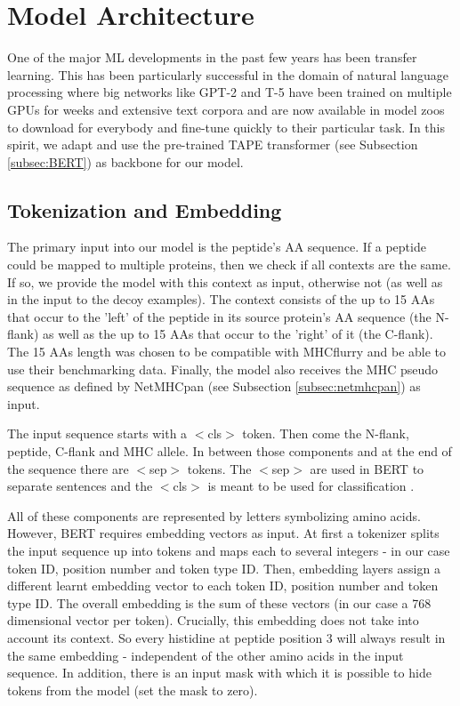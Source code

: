 \documentclass[msc,deptreport,ai]{infthesis} %
\begin{document}
	\section{Model Architecture} 
		One of the major \gls{ML} developments in the past few years has been transfer learning. This has been particularly successful in the domain of natural language processing where big networks like GPT-2 and T-5 have been trained on multiple GPUs for weeks and extensive text corpora and are now available in model zoos to download for everybody and fine-tune quickly to  their particular task. In this spirit, we adapt and use the pre-trained \gls{TAPE} transformer (see Subsection \ref{subsec:BERT}) as backbone for our model.
	
		\subsection{Tokenization and Embedding}
			The primary input into our model is the peptide's \gls{AA} sequence. If a peptide could be mapped to multiple proteins, then we check if all contexts are the same. If so, we provide the model with this context as input, otherwise not (as well as in the input to the decoy examples). The context consists of the up to 15 \glspl{AA} that occur to the 'left' of the peptide in its source protein's \gls{AA} sequence (the N-flank) as well as the up to 15 \glspl{AA} that occur to the 'right' of it (the C-flank). The 15 \glspl{AA} length was chosen to be compatible with MHCflurry and be able to use their benchmarking data. Finally, the model also receives the \gls{MHC} pseudo sequence as defined by NetMHCpan (see Subsection \ref{subsec:netmhcpan}) as  input.
			
			The input sequence starts with a $<$cls$>$ token. Then come the N-flank, peptide, C-flank and \gls{MHC} allele. In between those components and at the end of the sequence there are $<$sep$>$ tokens. The $<$sep$>$ are used in \gls{BERT} to separate sentences and the $<$cls$>$ is meant to be used for classification \cite{devlin_bert_2019}. 
			
			All of these components are represented by letters symbolizing amino acids. However, \gls{BERT} requires embedding vectors as input. At first a tokenizer splits the input sequence up into tokens and maps each to several integers - in our case token ID, position number and token type ID. Then, embedding layers assign a different learnt embedding vector to each token ID, position number and token type ID. The overall embedding is the sum of these vectors (in our case a 768 dimensional vector per token). Crucially, this embedding does not take into account its context. So every histidine at peptide position 3 will always result in the same embedding - independent of the other amino acids in the input sequence. In addition, there is an input mask with which it is possible to hide tokens from the model (set the mask to zero).
			
\end{document}
